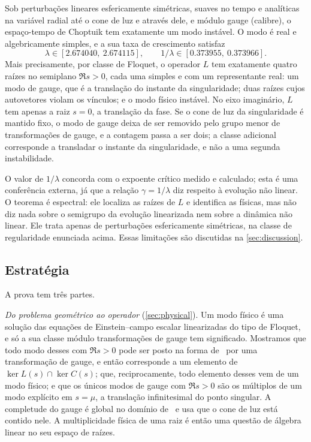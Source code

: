 \begin{introthm}
Sob perturbações lineares esfericamente simétricas, suaves no tempo e analíticas na variável radial até o cone de luz
e através dele, e módulo gauge (calibre), o espaço-tempo de Choptuik tem exatamente um modo instável. O modo é real e algebricamente simples, e a sua taxa de crescimento satisfaz
\[
  \lambda\in[2.674040,\ 2.674115],\qquad 1/\lambda\in[0.373955,\ 0.373966].
\]
Mais precisamente, por classe de Floquet, o operador $L$ tem exatamente quatro raízes no semiplano $\Re s>0$, cada uma simples
e com um representante real: um modo de gauge, que é a translação do instante da singularidade; duas raízes cujos autovetores
violam os vínculos; e o modo físico instável. No eixo imaginário, $L$ tem apenas a raiz $s=0$, a
translação da fase. Se o cone de luz da singularidade é mantido fixo, o modo de gauge deixa de ser removido pelo
grupo menor de transformações de gauge, e a contagem passa a ser dois; a classe adicional corresponde a transladar
o instante da singularidade, e não a uma segunda instabilidade.
\end{introthm}

O valor de $1/\lambda$ concorda com o expoente crítico medido e calculado; esta é uma conferência externa, já que
a relação $\gamma=1/\lambda$ diz respeito à evolução não linear. O teorema é espectral: ele localiza as raízes de
$L$ e identifica as físicas, mas não diz nada sobre o semigrupo da evolução linearizada nem sobre a dinâmica não
linear. Ele trata apenas de perturbações esfericamente simétricas, na classe de regularidade enunciada acima. Essas
limitações são discutidas na \cref{sec:discussion}.

\subsection{Estratégia}

A prova tem três partes.

\emph{Do problema geométrico ao operador} (\cref{sec:physical}). Um modo físico é uma solução das equações
de Einstein--campo escalar linearizadas do tipo de Floquet, e só a sua classe módulo transformações de gauge tem
significado. Mostramos que todo modo desses com $\Re s>0$ pode ser posto na forma de~\cite{RT2019} por uma transformação
de gauge, e então corresponde a um elemento de $\ker L(s)\cap\ker C(s)$; que, reciprocamente, todo elemento desses
vem de um modo físico; e que os únicos modos de gauge com $\Re s>0$ são os múltiplos de um modo explícito em
$s=\mu$, a translação infinitesimal do ponto singular. A completude do gauge é global no domínio
de~\cite{RT2019} e usa que o cone de luz está contido nele. A multiplicidade física de uma raiz é então uma questão
de álgebra linear no seu espaço de raízes.

